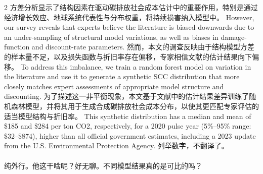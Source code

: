 \documentclass[cn,hazy,blue,14pt,screen]{elegantnote}
\begin{document}
\begin{paracol}{2}
		\switchcolumn
	方差分析显示了结构因素在驱动碳排放社会成本估计中的重要作用，特别是通过经济增长效应、地球系统代表性与分布权重，将持续损害纳入模型中。
	\switchcolumn*
	However, our survey reveals that experts believe the literature is biased downwards due to an under-sampling of structural model variations, as well as biases in damage-function and discount-rate parameters. 
	\switchcolumn
	然而，本文的调查反映由于结构模型方差的样本量不足，以及损失函数与折旧率存在偏移，专家相信文献的估计结果向下偏移。
	\switchcolumn*
	To address this imbalance, we train a random forest model on variation in the literature and use it to generate a synthetic SCC distribution that more closely matches expert assessments of appropriate model structure and discounting. 
	\switchcolumn
	为了描述这一非平衡现象，本文基于文献中的估计结果差异训练了随机森林模型，并将其用于生成合成碳排放社会成本分布，以使其更匹配专家评估的适当模型结构与折旧率。
	\switchcolumn*
	This synthetic distribution has a median and mean of \$185 and \$284 per ton CO2, respectively, for a 2020 pulse year (5\%–95\% range: \$32–\$874), higher than all official government estimates, including a 2023 update from the U.S. Environmental Protection Agency.
	\switchcolumn
	列举数字，不翻译了。
	\\~\\
	纯外行。他这干啥呢？好无聊。不同模型结果真的是可比的吗？
	
\end{paracol}
\end{document}
